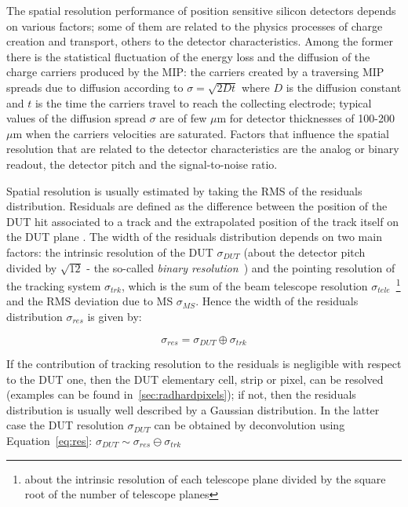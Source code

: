 The spatial resolution performance of position sensitive silicon detectors depends on various factors; 
some of them are related to the physics processes of charge creation and transport, others to 
the detector characteristics. 
Among the former there is the statistical fluctuation 
of the energy loss 
 and the diffusion of the charge carriers produced by the MIP: the carriers created by a traversing MIP 
 spreads  due to diffusion according to $\sigma = \sqrt{2Dt}$ where $D$ is the diffusion constant and 
 $t$ is the time the carriers travel to reach the collecting electrode; typical values of the diffusion 
 spread $\sigma$ are of few $\mu$m for detector thicknesses of 100-200~$\mu$m when the  
  carriers velocities are saturated.
Factors that influence the spatial resolution that are related to the  detector characteristics are the 
analog or binary readout, the detector pitch and the signal-to-noise ratio.

Spatial resolution is usually estimated by taking the RMS of the residuals distribution. Residuals are 
defined as the difference between the position of the DUT hit associated to a track and 
the extrapolated position of the track itself on the DUT plane . 
The width of the residuals distribution depends on two main factors: the intrinsic resolution of the 
DUT $\sigma_{DUT}$ (about the detector pitch divided by $\sqrt{12}$ - the so-called {\it binary  resolution}~\cite{TURCHETTA}) and the pointing resolution of the tracking system $\sigma_{trk}$, which is the sum of the beam telescope resolution $\sigma_{tele}$~\footnote{about the intrinsic resolution of each telescope plane divided by the square root of the number of 
telescope planes} and the RMS deviation due to MS $\sigma_{MS}$. Hence the width of the residuals distribution $\sigma_{res}$ is given by:


\begin{equation}
\sigma_{res}=\sigma_{DUT}\oplus\sigma_{trk}
\label{eq:res}
\end{equation}

If the contribution of tracking resolution to the residuals is negligible with respect to the DUT 
one, then the DUT elementary cell, strip or pixel, can be resolved (examples can be found 
in~\ref{sec:radhardpixels}); if not, then the residuals distribution 
is usually well described by a Gaussian distribution. In the latter case the DUT resolution $\sigma_{DUT}$  can be obtained by deconvolution 
using Equation~\ref{eq:res}: $\sigma_{DUT}\sim\sigma_{res}\ominus\sigma_{trk}$

